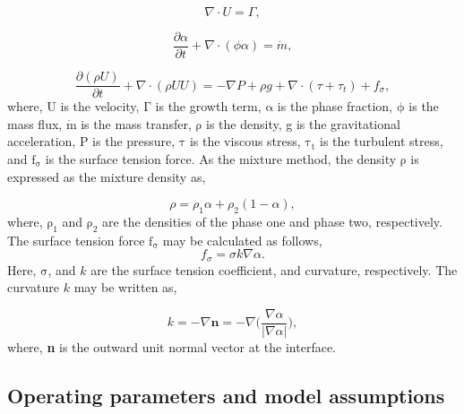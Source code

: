 \begin{equation}
    \label{eq:continuity}
    \nabla \cdot U = \Gamma,
\end{equation}

\begin{equation}
    \label{eq:mass}
    \frac{\partial \alpha}{\partial t} + \nabla\cdot (\phi \alpha) = \Dot{m},
\end{equation}

\begin{equation}
    \label{eq:momentum}
    \frac{\partial (\rho U)}{\partial t} + \nabla\cdot (\rho U U) = -\nabla P + \rho g+\nabla \cdot (\tau+\tau_t)+f_{\sigma},
\end{equation}
where, U is the velocity, $\mathrm{\Gamma}$ is the growth term, $\mathrm{\alpha}$ is the phase fraction, $\mathrm{\phi}$ is the mass flux, $\mathrm{\Dot{m}}$ is the mass transfer, $\mathrm{\rho}$ is the density, g is the gravitational acceleration, P is the pressure, $\mathrm{\tau}$ is the viscous stress, $\mathrm{\tau_t}$ is the turbulent stress, and $\mathrm{f_{\sigma}}$ is the surface tension force. As the mixture method, the density $\mathrm{\rho}$ is expressed as the mixture density as,  

\begin{equation}
    \label{eq:mixtureDensity}
    \rho = \rho_1 \alpha + \rho_2 (1-\alpha),
\end{equation}
where, $\mathrm{\rho_1}$ and $\mathrm{\rho_2}$ are the densities of the phase one and phase two, respectively. The surface tension force $\mathrm{f_{\sigma}}$ may be calculated as follows,
\begin{equation}
    \label{eq:surfaceTension}
    f_{\sigma} = \sigma k \nabla\alpha.
\end{equation}
Here, $\mathrm{\sigma}$, and $k$ are the surface tension coefficient, and curvature, respectively. The curvature $k$ may be written as, 

\begin{equation}
    \label{eq:curvature}
    k = -\nabla \mathbf{n} = -\nabla \Bigg(\frac{\nabla \alpha}{\big| \nabla \alpha\big|} \Bigg),
\end{equation}
where, \textbf{n} is the outward unit normal vector at the interface.

\subsection{Operating parameters and model assumptions}


